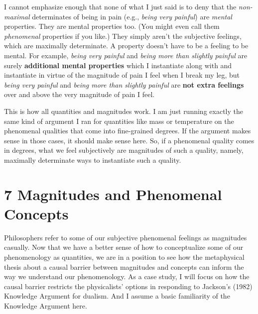 \documentclass[a4paper,12pt]{article}
\begin{document}

I cannot emphasize enough that none of what I just said is to deny that the \emph{non-maximal} determinates of being in pain (e.g., \emph{being very painful}) are \emph{mental} properties. They are mental properties too. (You might even call them \emph{phenomenal} properties if you like.) They simply aren't the subjective feelings, which are maximally determinate. A property doesn't have to be a feeling to be mental. For example, \emph{being very painful} and \emph{being more than slightly painful} are surely \textbf{additional mental properties} which I instantiate along with and instantiate in virtue of the magnitude of pain I feel when I break my leg, but \emph{being very painful} and \emph{being more than slightly painful} are \textbf{not extra feelings} over and above the very magnitude of pain I feel.

This is how all quantities and magnitudes work. I am just running exactly the same kind of argument I ran for quantities like mass or temperature on the phenomenal qualities that come into fine-grained degrees. If the argument makes sense in those cases, it should make sense here. So, if a phenomenal quality comes in degrees, what we feel subjectively are magnitudes of such a quality, namely, maximally determinate ways to instantiate such a quality.

\section*{7 Magnitudes and Phenomenal Concepts}

Philosophers refer to some of our subjective phenomenal feelings as magnitudes casually. Now that we have a better sense of how to conceptualize some of our phenomenology as quantities, we are in a position to see how the metaphysical thesis about a causal barrier between magnitudes and concepts can inform the way we understand our phenomenology. As a case study, I will focus on how the causal barrier restricts the physicalists' options in responding to Jackson's (1982) Knowledge Argument for dualism. And I assume a basic familiarity of the Knowledge Argument here.
\end{document}
